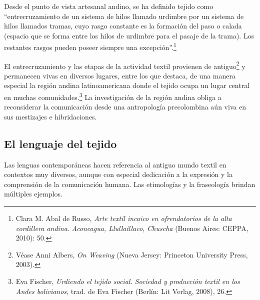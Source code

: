 \documentclass{tufte-handout}
\begin{document}
Desde el punto de vista artesanal andino, se ha definido tejido como
``entrecruzamiento de un sistema de hilos llamado urdimbre por un
sistema de hilos llamados tramas, cuyo rasgo constante es la formación
del paso o calada (espacio que se forma entre los hilos de urdimbre para
el pasaje de la trama). Los restantes rasgos pueden poseer siempre una
excepción''.\footnote{Clara M. Abal de Russo, \emph{Arte textil incaico
  en ofrendatorios de la alta cordillera andina}. \emph{Aconcagua,
  Llullaillaco, Chuscha} (Buenos Aires: CEPPA, 2010): 50.}

El entrecruzamiento y las etapas de la actividad textil provienen de
antiguo\footnote{Véase Anni Albers, \emph{On Weaving} (Nueva Jersey:
  Princeton University Press, 2003).} y permanecen vivas en diversos
lugares, entre los que destaca, de una manera especial la región andina
latinoamericana donde el tejido ocupa un lugar central en muchas
comunidades.\footnote{Eva Fischer, \emph{Urdiendo el tejido social.
  Sociedad y producción textil en los Andes bolivianos}, trad. de Eva
  Fischer (Berlín: Lit Verlag, 2008), 26.} La investigación de la región
andina obliga a reconsiderar la comunicación desde una antropología
precolombina aún viva en sus mestizajes e hibridaciones.

\hypertarget{el-lenguaje-del-tejido}{%
\subsection{El lenguaje del
tejido}\label{el-lenguaje-del-tejido}}

Las lenguas contemporáneas hacen referencia al antiguo mundo textil en
contextos muy diversos, aunque con especial dedicación a la expresión y
la comprensión de la comunicación humana. Las etimologías y la
fraseología brindan múltiples ejemplos.
\end{document}
